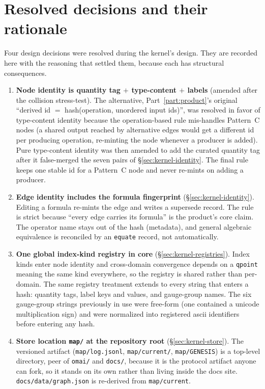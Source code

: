 \documentclass[11pt,a4paper]{article}
\begin{document}
\section{Resolved decisions and their rationale}
\label{sec:kernel-decisions}

Four design decisions were resolved during the kernel's design. They are recorded
here with the reasoning that settled them, because each has structural
consequences.

\begin{enumerate}[leftmargin=2em, itemsep=0.4em]
  \item \textbf{Node identity is quantity tag $+$ type-content $+$ labels}
        (amended after the collision stress-test). The alternative,
        Part~\ref{part:product}'s original ``derived id $=$ hash(operation,
        unordered input ids)'', was resolved in favor of type-content identity
        because the operation-based rule mis-handles Pattern~C nodes (a shared
        output reached by alternative edges would get a different id per
        producing operation, re-minting the node whenever a producer is added).
        Pure type-content identity was then amended to add the curated quantity
        tag after it false-merged the seven pairs of
        \S\ref{sec:kernel-identity}. The final rule keeps one stable id for a
        Pattern~C node and never re-mints on adding a producer.
  \item \textbf{Edge identity includes the formula fingerprint}
        (\S\ref{sec:kernel-identity}). Editing a formula re-mints the edge and
        writes a supersede record. The rule is strict because ``every
        edge carries its formula'' is the product's core claim. The operator name
        stays out of the hash (metadata), and general algebraic equivalence is
        reconciled by an \texttt{equate} record, not automatically.
  \item \textbf{One global index-kind registry in core}
        (\S\ref{sec:kernel-registries}). Index kinds enter node identity and
        cross-domain convergence depends on a \texttt{qpoint} meaning the same
        kind everywhere, so the registry is shared rather than per-domain. The
        same registry treatment extends to every string that enters a hash:
        quantity tags, label keys and values, and gauge-group names. The six
        gauge-group strings previously in use were free-form (one contained a
        unicode multiplication sign) and were normalized into registered ascii
        identifiers before entering any hash.
  \item \textbf{Store location \texttt{map/} at the repository root}
        (\S\ref{sec:kernel-store}). The versioned artifact
        (\texttt{map/log.jsonl}, \texttt{map/current/}, \texttt{map/GENESIS}) is a
        top-level directory, peer of \texttt{omai/} and \texttt{docs/}, because it
        is the protocol artifact anyone can fork, so it stands on its own rather
        than living inside the docs site. \texttt{docs/data/graph.json} is
        re-derived from \texttt{map/current}.
\end{enumerate}
\end{document}
